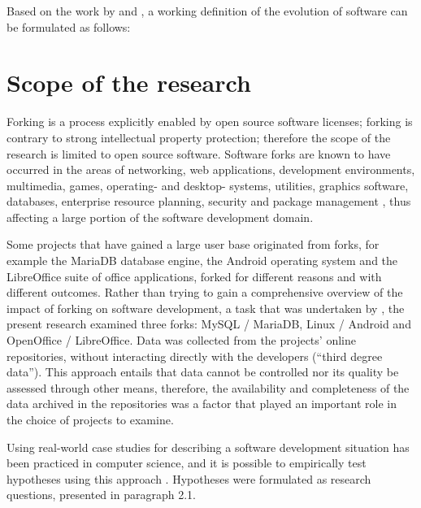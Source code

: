 \noindent
Based on the work by \citet{Nehaniv2006a} and \citet{Yu2006a}, a working definition of the evolution of software can be formulated as follows:



\section{Scope of the research}

Forking is a process explicitly enabled by open source software licenses; forking is contrary to strong intellectual property protection; therefore the scope of the research is limited to open source software. Software forks are known to have occurred in the areas of networking, web applications, development environments, multimedia, games, operating- and desktop- systems, utilities, graphics software, databases, enterprise resource planning, security and package management \citep{Robles2012a}, thus affecting a large portion of the software development domain.

Some projects that have gained a large user base originated from forks, for example the MariaDB database engine, the Android operating system and the LibreOffice suite of office applications, forked for different reasons and with different outcomes. Rather than trying to gain a comprehensive overview of the impact of forking on software development, a task that was undertaken by \citet{Robles2012a}, the present research examined three forks: MySQL / MariaDB, Linux / Android and OpenOffice / LibreOffice. Data was collected from the projects' online repositories, without interacting directly with the developers (“third degree data”). This approach entails that data cannot be controlled nor its quality be assessed through other means, therefore, the availability and completeness of the data archived in the repositories was a factor that played an important role in the choice of projects to examine.

Using real-world case studies for describing a software development situation has been practiced in computer science, and it is possible to empirically test hypotheses using this approach \citep{Runeson2009b}. Hypotheses were formulated as research questions, presented in paragraph 2.1.

